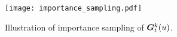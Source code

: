 \begin{figure}[h]
	\centering
	\texttt{[image: importance\_sampling.pdf]}
	\caption{Illustration of importance sampling of $\bm{G}_t^k(u)$.}
	\label{fig:sampling}
	\vspace{-10pt}
\end{figure}



